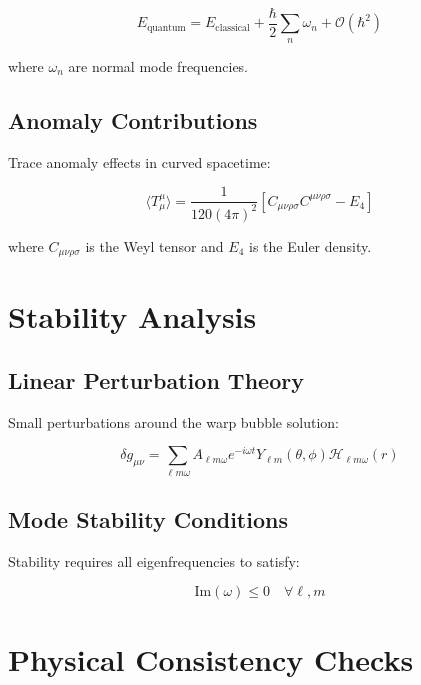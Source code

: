 \documentclass[12pt,a4paper]{article}
\begin{document}
\begin{equation}
E_{\text{quantum}} = E_{\text{classical}} + \frac{\hbar}{2} \sum_n \omega_n + \mathcal{O}(\hbar^2)
\end{equation}

where $\omega_n$ are normal mode frequencies.

\subsection{Anomaly Contributions}

Trace anomaly effects in curved spacetime:

\begin{equation}
\langle T_\mu^\mu \rangle = \frac{1}{120(4\pi)^2} \left[ C_{\mu\nu\rho\sigma} C^{\mu\nu\rho\sigma} - E_4 \right]
\end{equation}

where $C_{\mu\nu\rho\sigma}$ is the Weyl tensor and $E_4$ is the Euler density.

\section{Stability Analysis}

\subsection{Linear Perturbation Theory}

Small perturbations around the warp bubble solution:

\begin{equation}
\delta g_{\mu\nu} = \sum_{\ell m \omega} A_{\ell m \omega} e^{-i\omega t} Y_{\ell m}(\theta,\phi) \mathcal{H}_{\ell m \omega}(r)
\end{equation}

\subsection{Mode Stability Conditions}

Stability requires all eigenfrequencies to satisfy:

\begin{equation}
\text{Im}(\omega) \leq 0 \quad \forall \ell, m
\end{equation}

\section{Physical Consistency Checks}
\end{document}
